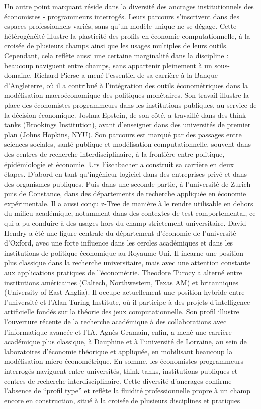Un autre point marquant réside dans la diversité des ancrages institutionnels des économistes - programmeurs interrogés. Leurs parcours s’inscrivent dans des espaces professionnels variés, sans qu’un modèle unique ne se dégage. Cette hétérogénéité illustre la plasticité des profils en économie computationnelle, à la croisée de plusieurs champs ainsi que les usages multiples de leurs outils. Cependant, cela reflète aussi une certaine marginalité dans la discipline : beaucoup naviguent entre champs, sans appartenir pleinement à un sous-domaine. Richard Pierse a mené l’essentiel de sa carrière à la Banque d’Angleterre, où il a contribué à l’intégration des outils économétriques dans la modélisation macroéconomique des politiques monétaires. Son travail illustre la place des économistes-programmeurs dans les institutions publiques, au service de la décision économique. Joshua Epstein, de son côté, a travaillé dans des think tanks (Brookings Institution), avant d’enseigner dans des universités de premier plan (Johns Hopkins, NYU). Son parcours est marqué par des passages entre sciences sociales, santé publique et modélisation computationnelle, souvent dans des centres de recherche interdisciplinaire, à la frontière entre politique, épidémiologie et économie. Urs Fischbacher a construit sa carrière en deux étapes. D’abord en tant qu’ingénieur logiciel dans des entreprises privé et dans des organismes publiques. Puis dans une seconde partie, à l’université de Zurich puis de Constance, dans des départements de recherche appliquée en économie expérimentale. Il a aussi conçu z-Tree de manière à le rendre utilisable en dehors du milieu académique, notamment dans des contextes de test comportemental, ce qui a pu conduire à des usages hors du champ strictement universitaire. David Hendry a été une figure centrale du département d’économie de l’université d’Oxford, avec une forte influence dans les cercles académiques et dans les institutions de politique économique au Royaume-Uni. Il incarne une position plus classique dans la recherche universitaire, mais avec une attention constante aux applications pratiques de l’économétrie. Theodore Turocy a alterné entre institutions américaines (Caltech, Northwestern, Texas AM) et britanniques (University of East Anglia). Il occupe actuellement une position hybride entre l’université et l’Alan Turing Institute, où il participe à des projets d’intelligence artificielle fondés sur la théorie des jeux computationnelle. Son profil illustre l’ouverture récente de la recherche académique à des collaborations avec l’informatique avancée et l’IA. Agnès Gramain, enfin, a mené une carrière académique plus classique, à Dauphine et à l’université de Lorraine, au sein de laboratoires d’économie théorique et appliquée, en mobilisant beaucoup la modélisation micro économétrique. En somme, les économistes-programmeurs interrogés naviguent entre universités, think tanks, institutions publiques et centres de recherche interdisciplinaire. Cette diversité d’ancrages confirme l’absence de “profil type” et reflète la fluidité professionnelle propre à un champ encore en construction, situé à la croisée de plusieurs disciplines et pratiques


